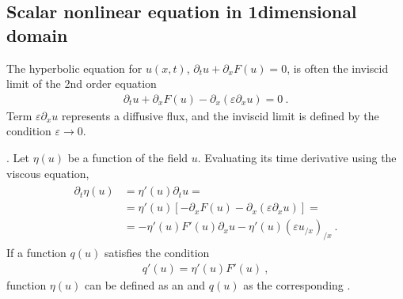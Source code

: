\documentclass[letterpaper,10pt,english]{jupyterBook}
\begin{document}
\subsection{Scalar non\sphinxhyphen{}linear equation in 1\sphinxhyphen{}dimensional domain}
\label{\detokenize{ch/pde/hyperbolic-entropy:scalar-non-linear-equation-in-1-dimensional-domain}}\label{\detokenize{ch/pde/hyperbolic-entropy:pde-hyperbolic-entropy-1d-scalar}}
\sphinxAtStartPar
The hyperbolic equation for \(u(x,t)\), \(\partial_t u + \partial_x F(u) = 0\), is often the inviscid limit of the 2\sphinxhyphen{}nd order equation
\begin{equation*}
\begin{split}\partial_t u + \partial_x F(u) - \partial_x \left( \varepsilon \partial_x u \right) = 0 \ .\end{split}
\end{equation*}
\sphinxAtStartPar
Term \(\varepsilon \partial_x u\) represents a diffusive flux, and the inviscid limit is defined by the condition \(\varepsilon \rightarrow 0\).

\sphinxAtStartPar
{}. Let \(\eta(u)\) be a function of the field \(u\). Evaluating its time derivative using the viscous equation,
\begin{equation*}
\begin{split}\begin{aligned}
  \partial_t \eta(u) 
  & = \eta'(u) \partial_t u = \\
  & = \eta'(u) \left[ - \partial_x F(u) - \partial_x ( \varepsilon \partial_x u ) \right] = \\
  & = - \eta'(u) F'(u) \partial_x u - \eta'(u) ( \varepsilon u_{/x} )_{/x} \ .
\end{aligned}\end{split}
\end{equation*}
\sphinxAtStartPar
If a function \(q(u)\) satisfies the condition
\begin{equation*}
\begin{split}q'(u) = \eta'(u) F'(u) \ ,\end{split}
\end{equation*}
\sphinxAtStartPar
function \(\eta(u)\) can be defined as an  and \(q(u)\) as the corresponding .
\end{document}
